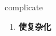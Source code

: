 
\begin{frame}
{\huge complicate}
\begin{center}
\begin{enumerate}\Large
  \item \textbf{使复杂化}
\end{enumerate}
\end{center}
\end{frame}
